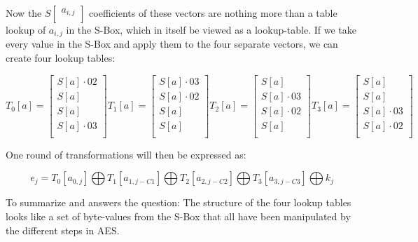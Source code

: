 \documentclass{article}
\begin{document}
Now the $S \begin{bmatrix} a_{i,j} \\ \end{bmatrix}$ coefficients of these vectors are nothing more than a table lookup of $a_{i,j}$ in the S-Box, which in itself be viewed as a lookup-table. If we take every value in the S-Box and apply them to the four separate vectors, we can create four lookup tables:

\[
T_{0}[a] =
\begin{bmatrix}
S[a] \cdot 02 \\
S[a] \\
S[a] \\
S[a] \cdot 03 \\
\end{bmatrix}
T_{1}[a] =
\begin{bmatrix}
S[a] \cdot 03 \\
S[a] \cdot 02\\
S[a] \\
S[a] \\
\end{bmatrix}
T_{2}[a] =
\begin{bmatrix}
S[a] \\
S[a] \cdot 03 \\
S[a] \cdot 02\\
S[a] \\
\end{bmatrix}
T_{3}[a] =
\begin{bmatrix}
S[a] \\
S[a] \\
S[a] \cdot 03\\
S[a] \cdot 02\\
\end{bmatrix}
\]

One round of transformations will then be expressed as:

\[
e_{j} = T_{0}[a_{0,j}]
\bigoplus
T_{1}[a_{1,j-C1}]
\bigoplus
T_{2}[a_{2,j-C2}]
\bigoplus
T_{3}[a_{3,j-C3}]
\bigoplus
k_{j}
\]

To summarize and answers the question:
The structure of the four lookup tables looks like a set of byte-values from the S-Box that all have been manipulated by the different steps in AES.

\end{document}

